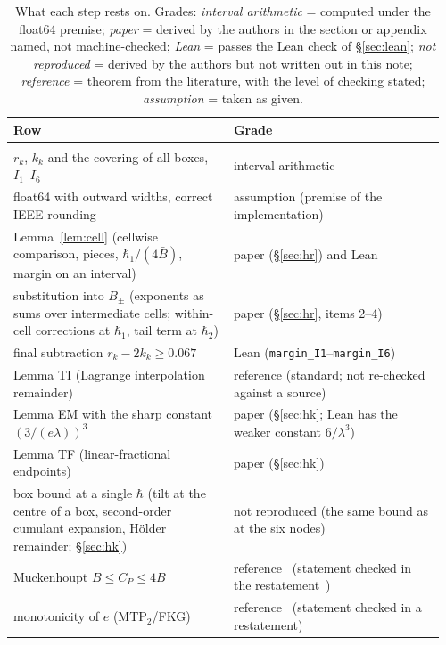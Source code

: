 \documentclass[11pt,a4paper]{article}
\theoremstyle{definition}
\theoremstyle{remark}
\begin{document}
\begin{table}[!htbp]\centering\footnotesize
\caption{What each step rests on. Grades: \emph{interval arithmetic} = computed under the float64 premise; \emph{paper} = derived by the authors in the section or appendix named, not machine-checked; \emph{Lean} = passes the Lean check of \S\ref{sec:lean}; \emph{not reproduced} = derived by the authors but not written out in this note; \emph{reference} = theorem from the literature, with the level of checking stated; \emph{assumption} = taken as given.}\label{tab:status}
\begin{tabular}{@{}>{\raggedright\arraybackslash}p{0.49\linewidth}>{\raggedright\arraybackslash}p{0.47\linewidth}@{}}\toprule
Row & Grade\\\midrule
\multicolumn{2}{@{}l}{\emph{The margin on $[0.005/1.17^6,\,0.005]$ (\S\S\ref{sec:scheme}--\ref{sec:results})}}\\
$r_k$, $k_k$ and the covering of all boxes, $I_1$--$I_6$ & interval arithmetic\\
float64 with outward widths, correct IEEE rounding & assumption (premise of the implementation)\\
Lemma~\ref{lem:cell} (cellwise comparison, pieces, $\hbar_1/(4\bar B)$, margin on an interval) & paper (\S\ref{sec:hr}) and Lean\\
substitution into $B_\pm$ (exponents as sums over intermediate cells; within-cell corrections at $\hbar_1$, tail term at $\hbar_2$) & paper (\S\ref{sec:hr}, items 2--4)\\
final subtraction $r_k-2k_k\ge0.067$ & Lean (\texttt{margin\_I1}--\texttt{margin\_I6})\\
Lemma TI (Lagrange interpolation remainder) & reference (standard; not re-checked against a source)\\
Lemma EM with the sharp constant $(3/(e\lambda))^3$ & paper (\S\ref{sec:hk}; Lean has the weaker constant $6/\lambda^3$)\\
Lemma TF (linear-fractional endpoints) & paper (\S\ref{sec:hk})\\
box bound at a single $\hbar$ (tilt at the centre of a box, second-order cumulant expansion, Hölder remainder; \S\ref{sec:hk}) & not reproduced (the same bound as at the six nodes)\\
Muckenhoupt $B\le C_P\le4B$ & reference~\cite{Mu,BR} (statement checked in the restatement~\cite{BR})\\
monotonicity of $e$ (MTP$_2$/FKG) & reference~\cite{KR} (statement checked in a restatement)\\

\end{tabular}
\end{table}
\end{document}
